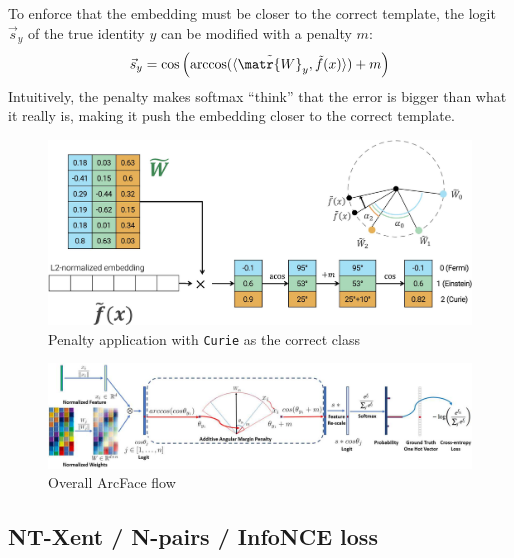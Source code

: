 \begin{description}
        To enforce that the embedding must be closer to the correct template, the logit $\vec{s}_y$ of the true identity $y$ can be modified with a penalty $m$:
        \[ \vec{s}_y = \cos\left( \arccos(\langle \tilde{\matr{W}}_y, \tilde{f}(x) \rangle) + m \right) \]
        Intuitively, the penalty makes softmax ``think'' that the error is bigger than what it really is, making it push the embedding closer to the correct template.

        \begin{figure}[H]
            \centering
            \includegraphics[width=0.65\linewidth]{./img/_arcface_penalty.jpg}
            \caption{Penalty application with \texttt{Curie} as the correct class}
        \end{figure}

        \begin{figure}[H]
            \centering
            \includegraphics[width=0.95\linewidth]{./img/_arcface_flow.jpg}
            \caption{Overall ArcFace flow}
        \end{figure}
\end{description}


\subsection{NT-Xent / N-pairs / InfoNCE loss}

